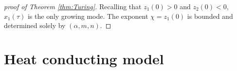 \documentclass[a4paper,11pt]{article}
\newtheorem{theorem}{Theorem}
\theoremstyle{remark}
\begin{document}
\begin{proof}[proof of Theorem \ref{thm:Turing}]
 Recalling that $z_1(0)>0$ and $z_2(0)<0$, $x_1(\tau)$ is the only growing mode. The exponent $\chi=z_1(0)$ is bounded and determined solely by $(\alpha,m,n)$.
%
\end{proof}

%
%

\section{Heat conducting model}
\end{document}
